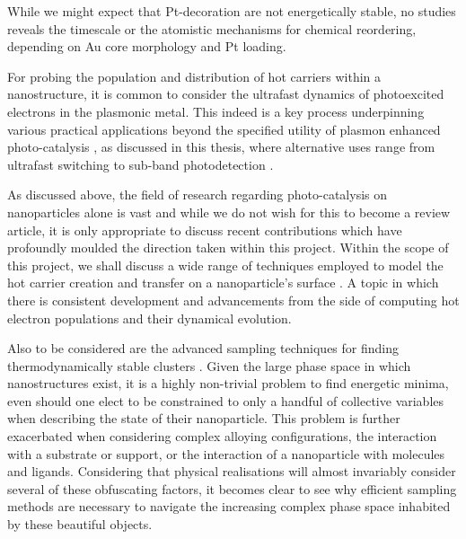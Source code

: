While we might expect that Pt-decoration are not energetically stable, no studies reveals the timescale or the atomistic mechanisms for chemical reordering, depending on Au core morphology and Pt loading.

For probing the population and distribution of hot carriers within a nanostructure, it is common to consider the ultrafast dynamics of photoexcited electrons in the plasmonic metal. This indeed is a key process underpinning various practical applications beyond the specified utility of plasmon enhanced photo-catalysis \cite{Brongersma2015,HotImpossible,Clavero2014}, as discussed in this thesis, where alternative uses range from ultrafast switching \cite{ControlPhase,Karnetzky2018,Hendrick2017} to sub-band photodetection \cite{HollowMetal,Knight2011,Zhou2019}.

As discussed above, the field of research regarding photo-catalysis on nanoparticles alone is vast and while we do not wish for this to become a review article, it is only appropriate to discuss recent contributions which have profoundly moulded the direction taken within this project. Within the scope of this project, we shall discuss a wide range of techniques employed to model the hot carrier creation and transfer on a nanoparticle's surface \cite{NordLander,HotCarrierTransport}. A topic in which there is consistent development and advancements from the side of computing hot electron populations and their dynamical evolution. 

Also to be considered are the advanced sampling techniques for finding thermodynamically stable clusters \cite{Structure_Thermo_EnergyLandscape,FerrandoEquilibrium}. Given the large phase space in which nanostructures exist, it is a highly non-trivial problem to find energetic minima, even should one elect to be constrained to only a handful of collective variables when describing the state of their nanoparticle. This problem is further exacerbated when considering complex alloying configurations, the interaction with a substrate or support, or the interaction of a nanoparticle with molecules and ligands. Considering that physical realisations will almost invariably consider several of these obfuscating factors, it becomes clear to see why efficient sampling methods are necessary to navigate the increasing complex phase space inhabited by these beautiful objects. 

